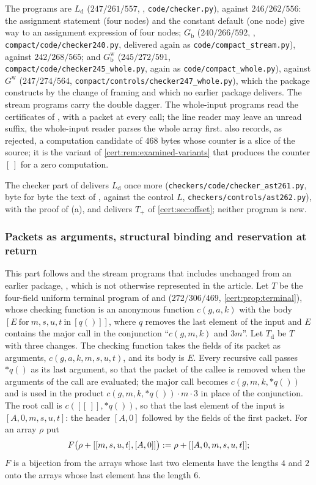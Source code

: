 The programs are $L_{\mathrm d}$ ($247/261/557$, ,
\texttt{code/checker.py}), against $246/262/556$: the assignment statement (four
nodes) and the constant default (one node) give way to an assignment expression
of four nodes; $G_{\mathrm b}$ ($240/266/592$, ,
\texttt{compact/code/checker240.py}, delivered again as
\texttt{code/compact\_stream.py}), against $242/268/565$; and
$G^{\mathrm w}_{\mathrm b}$ ($245/272/591$, \texttt{compact/code/checker245\_whole.py},
again as \texttt{code/compact\_whole.py}), against $G^{\mathrm w}$
($247/274/564$, \texttt{compact/controls/checker247\_whole.py}), which the package
constructs by the change of framing and which no earlier package delivers. The
stream programs carry the double dagger. The whole-input programs read the
certificates of , with a packet at every call; the
line reader may leave an unread suffix, the whole-input reader parses the whole
array first.  also records, as rejected, a
computation candidate of $468$ bytes whose counter is a slice of the source; it
is the variant of \cref{cert:rem:examined-variants} that produces the counter
$[\,]$ for a zero computation.

The checker part of  delivers $L_{\mathrm d}$ once more
(\texttt{checkers/code/checker\_ast261.py}, byte for byte the text of
, against the control $L$, \texttt{checkers/controls/ast262.py}),
with the proof of (a), and delivers $T_{+}$ of \cref{cert:sec:offset}; neither
program is new.

\subsubsection*{Packets as arguments, structural binding and reservation at return}

This part follows  and the stream programs that
 includes unchanged from an earlier package,
, which is not otherwise represented in the article.
Let $T$ be the four-field uniform terminal program of  and
 ($272/306/469$, \cref{cert:prop:terminal}), whose
checking function is an anonymous function $c(g,a,k)$ with the body
$[E\ \text{for}\ m,s,u,t\ \text{in}\ [q()]]$, where $q$ removes the last element
of the input and $E$ contains the major call in the conjunction
``$c(g,m,k)$ and $3m$''. Let $T_{\mathrm d}$ be $T$ with three changes. The
checking function takes the fields of its packet as arguments, $c(g,a,k,m,s,u,t)$,
and its body is $E$. Every recursive call passes ${*}q()$ as its last argument, so
that the packet of the callee is removed when the arguments of the call are
evaluated; the major call becomes $c(g,m,k,{*}q())$ and is used in the product
$c(g,m,k,{*}q())\cdot m\cdot 3$ in place of the conjunction. The root call is
$c([[\,]],{*}q())$, so that the last element of the input is $[A,0,m,s,u,t]$:
the header $[A,0]$ followed by the fields of the first packet. For an array
$\rho$ put
\[
F\bigl(\rho+[[m,s,u,t],[A,0]]\bigr)\mathrel{:=}\rho+[[A,0,m,s,u,t]];
\]
$F$ is a bijection from the arrays whose last two elements have the lengths $4$
and $2$ onto the arrays whose last element has the length $6$.

